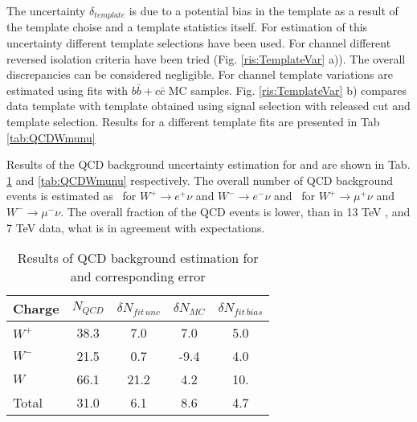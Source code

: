 The uncertainty $\delta_{template}$ is due to a potential bias in the template as a result of the template choise and a template statistics itself. For estimation of this uncertainty different template selections have been used. For \wenu channel different reversed isolation criteria have been tried (Fig. \ref{ris:TemplateVar} a)). The overall discrepancies can be considered negligible. For \wmunu channel template variations are estimated using fits with $b\bar{b}+c\bar{c}$ MC samples.  Fig. \ref{ris:TemplateVar} b) compares data template with template obtained using signal selection with released \mtw cut and template selection. Results for a different template fits are presented in Tab \ref{tab:QCDWmunu}



Results of the QCD background uncertainty estimation for \wenu and \wmunu are shown in Tab. \ref{tab:QCDWenu} and \ref{tab:QCDWmunu} respectively. The overall number of QCD background events is estimated as \nQCDWplusenu\,  for $W^{+}\to e^{+}\nu$ and $W^{-}\to e^{-}\nu$ and \nQCDWplusmunu\,   for $W^{+}\to \mu^{+}\nu$ and $W^{-}\to \mu^{-}\nu$. The overall fraction of the QCD events is lower, than in 13 TeV \cite{a13TeV}, and 7 TeV \cite{a7TeV} data, what is in agreement with expectations.

\begin{table}[!tbp]
    \caption{Results of QCD background estimation for \wenu and corresponding error}
	\label{tab:QCDWenu}
	\begin{center}
		\begin{tabular}{l | c | c | c | c }
		\hline
		    Charge & $N_{QCD}$ & $ \delta N_{fit\, unc} $ & $\delta N_{MC}$ & $\delta N_{fit\, bias}$ \\
		    \hline
		    $W^{+}$ & 38.3 & 7.0 & 7.0 & 5.0 \\
		    $W^{-} $ & 21.5 & 0.7 &  -9.4 & 4.0 \\
		    $W$ & 66.1 & 21.2 & 4.2 & 10.  \\
		    \hline
		    \hline
		    Total & 31.0 & 6.1 & 8.6 & 4.7 \\
		    \hline
		\end{tabular}
	\end{center}
\end{table}

